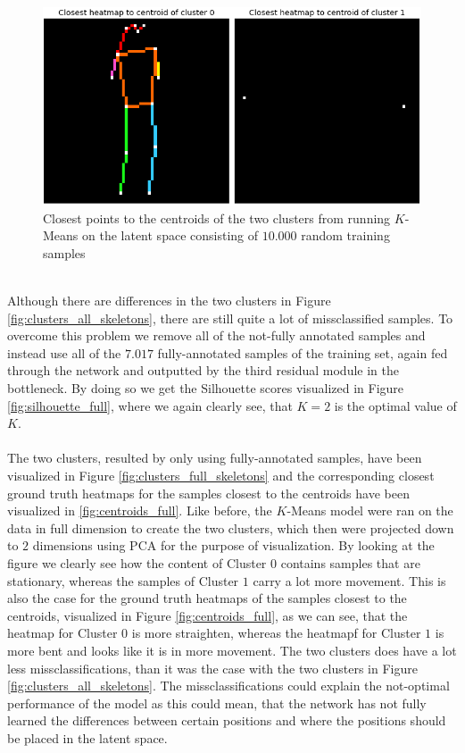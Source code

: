 \documentclass[./main.tex]{subfiles}
\begin{document}
\\
\begin{figure}[b]
    \centering
    \includegraphics[height = 4 cm]{entities/centroids_all_skeletons.png}
    \caption{Closest points to the centroids of the two clusters from running $K$-Means on the latent space consisting of $10.000$ random training samples}
    \label{fig:centroids_all}
\end{figure}
\\
Although there are differences in the two clusters in Figure \ref{fig:clusters_all_skeletons}, there are still quite a lot of missclassified samples. To overcome this problem we remove all of the not-fully annotated samples and instead use all of the $7.017$ fully-annotated samples of the training set, again fed through the network and outputted by the third residual module in the bottleneck. By doing so we get the Silhouette scores visualized in Figure \ref{fig:silhouette_full}, where we again clearly see, that $K = 2$ is the optimal value of $K$.
\\
\\
The two clusters, resulted by only using fully-annotated samples, have been visualized in Figure \ref{fig:clusters_full_skeletons} and the corresponding closest ground truth heatmaps for the samples closest to the centroids have been visualized in \ref{fig:centroids_full}. Like before, the $K$-Means model were ran on the data in full dimension to create the two clusters, which then were projected down to $2$ dimensions using PCA for the purpose of visualization. By looking at the figure we clearly see how the content of Cluster $0$ contains samples that are stationary, whereas the samples of Cluster $1$ carry a lot more movement. This is also the case for the ground truth heatmaps of the samples closest to the centroids, visualized in Figure \ref{fig:centroids_full}, as we can see, that the heatmap for Cluster $0$ is more straighten, whereas the heatmapf for Cluster $1$ is more bent and looks like it is in more movement. The two clusters does have a lot less missclassifications, than it was the case with the two clusters in Figure \ref{fig:clusters_all_skeletons}. The missclassifications could explain the not-optimal performance of the model as this could mean, that the network has not fully learned the differences between certain positions and where the positions should be placed in the latent space.
\end{document}
